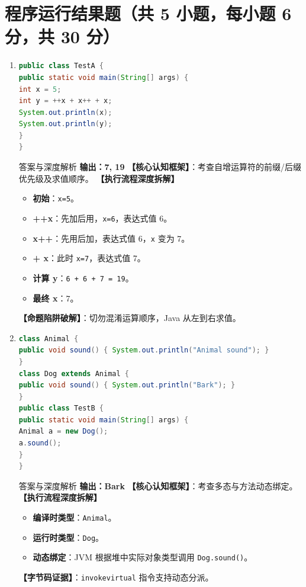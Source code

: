 ﻿\documentclass[12pt, a4paper]{ctexart}
\newcommand{\code}[1]{\texttt{#1}}
\begin{document}
\section{程序运行结果题（共 5 小题，每小题 6 分，共 30 分）}

\begin{enumerate}[label=\textbf{\arabic*.}, itemsep=1em]
	\item
	      \begin{lstlisting}[language=Java]
public class TestA {
public static void main(String[] args) {
int x = 5;
int y = ++x + x++ + x;
System.out.println(x);
System.out.println(y);
}
}
\end{lstlisting}
	      \begin{bluebox}{答案与深度解析}
		      \textbf{输出：7, 19}
		      \textbf{【核心认知框架】}：考查自增运算符的前缀/后缀优先级及求值顺序。
		      \textbf{【执行流程深度拆解】}
		      \begin{itemize}[leftmargin=*, nosep]
			      \item \textbf{初始}：\code{x=5}。
			      \item \textbf{++x}：先加后用，\code{x=6}，表达式值 6。
			      \item \textbf{x++}：先用后加，表达式值 6，\code{x} 变为 7。
			      \item \textbf{+ x}：此时 \code{x=7}，表达式值 7。
			      \item \textbf{计算 y}：\code{6 + 6 + 7 = 19}。
			      \item \textbf{最终 x}：7。
		      \end{itemize}
		      \textbf{【命题陷阱破解】}：切勿混淆运算顺序，Java 从左到右求值。
	      \end{bluebox}

	\item
	      \begin{lstlisting}[language=Java]
class Animal {
public void sound() { System.out.println("Animal sound"); }
}
class Dog extends Animal {
public void sound() { System.out.println("Bark"); }
}
public class TestB {
public static void main(String[] args) {
Animal a = new Dog();
a.sound();
}
}
\end{lstlisting}
	      \begin{bluebox}{答案与深度解析}
		      \textbf{输出：Bark}
		      \textbf{【核心认知框架】}：考查多态与方法动态绑定。
		      \textbf{【执行流程深度拆解】}
		      \begin{itemize}[leftmargin=*, nosep]
			      \item \textbf{编译时类型}：\code{Animal}。
			      \item \textbf{运行时类型}：\code{Dog}。
			      \item \textbf{动态绑定}：JVM 根据堆中实际对象类型调用 \code{Dog.sound()}。
		      \end{itemize}
		      \textbf{【字节码证据】}：\code{invokevirtual} 指令支持动态分派。
	      \end{bluebox}


\end{enumerate}
\end{document}
